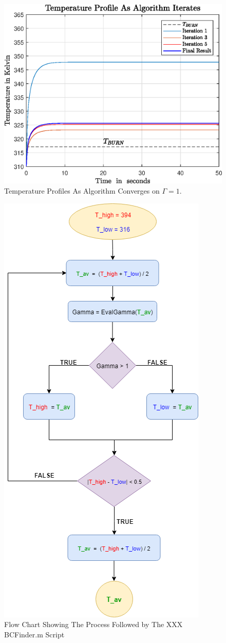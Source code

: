 \documentclass[11pt]{article}
\begin{document}
\begin{figure}[ht]  %
	\centering
	\includegraphics[width=.75\textwidth]{epsQ22BCTempProfs}
    \caption{Temperature Profiles As Algorithm Converges on $\Gamma = 1$.}\label{fig:q22profs}
\end{figure}

\begin{figure}[ht]  %
	\centering
	\includegraphics[width=.6\textwidth]{FindBCFlow.png}
    \caption{Flow Chart Showing The Process Followed by The XXX BCFinder.m Script}\label{fig:BCflowchart}
\end{figure}
\end{document}
